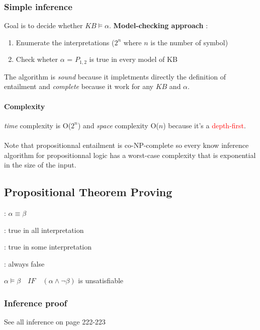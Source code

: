 \subsubsection{Simple inference}
Goal is to decide whether $KB \models \alpha$. 
\textbf{Model-checking approach} :
\begin{enumerate}
    \item Enumerate the interpretations ($2^n$ where $n$ is the number of symbol)
    \item Check wheter $\alpha$ = $P_{1,2}$ is true in every model of KB
\end{enumerate}

The algorithm is \textit{sound} because it impletments directly the definition of entailment and \textit{complete} because it work for any $KB$ and $\alpha$.

\paragraph{Complexity} \textit{time} complexity is O($2^n$) and \textit{space} complexity
O($n$) because it's a \textcolor{red}{depth-first}.


\paragraph{} Note that propositionnal entailment is co-NP-complete so every know inference
algorithm for propositionnal logic has a worst-case complexity that is exponential in
the size of the input.

\subsection{Propositional Theorem Proving}

\begin{description}
    \item[Logical equivalence] : $\alpha \equiv \beta$
    \item[Valid] : true in all interpretation
    \item[Satisfiable] : true in some interpretation
    \item[Unsatisfiable] : always false
    \item
    \item $\alpha \models \beta \quad IF \quad (\alpha \wedge \neg \beta)$ is unsatisfiable
\end{description}

\subsubsection{Inference proof}
See all inference on page 222-223

